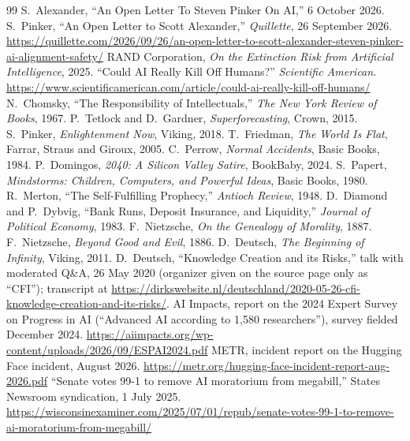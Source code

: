 \documentclass[11pt]{article}
\begin{document}
\begin{thebibliography}{99}
 S.\ Alexander, ``An Open Letter To Steven Pinker On AI,'' 6 October 2026.
 S.\ Pinker, ``An Open Letter to Scott Alexander,'' \emph{Quillette}, 26 September 2026. \url{https://quillette.com/2026/09/26/an-open-letter-to-scott-alexander-steven-pinker-ai-alignment-safety/}
 RAND Corporation, \emph{On the Extinction Risk from Artificial Intelligence}, 2025.
 ``Could AI Really Kill Off Humans?'' \emph{Scientific American}. \url{https://www.scientificamerican.com/article/could-ai-really-kill-off-humans/}
 N.\ Chomsky, ``The Responsibility of Intellectuals,'' \emph{The New York Review of Books}, 1967.
 P.\ Tetlock and D.\ Gardner, \emph{Superforecasting}, Crown, 2015.
 S.\ Pinker, \emph{Enlightenment Now}, Viking, 2018.
 T.\ Friedman, \emph{The World Is Flat}, Farrar, Straus and Giroux, 2005.
 C.\ Perrow, \emph{Normal Accidents}, Basic Books, 1984.
 P.\ Domingos, \emph{2040: A Silicon Valley Satire}, BookBaby, 2024.
 S.\ Papert, \emph{Mindstorms: Children, Computers, and Powerful Ideas}, Basic Books, 1980.
 R.\ Merton, ``The Self-Fulfilling Prophecy,'' \emph{Antioch Review}, 1948.
 D.\ Diamond and P.\ Dybvig, ``Bank Runs, Deposit Insurance, and Liquidity,'' \emph{Journal of Political Economy}, 1983.
 F.\ Nietzsche, \emph{On the Genealogy of Morality}, 1887.
 F.\ Nietzsche, \emph{Beyond Good and Evil}, 1886.
 D.\ Deutsch, \emph{The Beginning of Infinity}, Viking, 2011.
 D.\ Deutsch, ``Knowledge Creation and its Risks,'' talk with moderated Q\&A, 26 May 2020 (organizer given on the source page only as ``CFI''); transcript at \url{https://dirkswebsite.nl/deutschland/2020-05-26-cfi-knowledge-creation-and-its-risks/}.
 AI Impacts, report on the 2024 Expert Survey on Progress in AI (``Advanced AI according to 1,580 researchers''), survey fielded December 2024. \url{https://aiimpacts.org/wp-content/uploads/2026/09/ESPAI2024.pdf}
 METR, incident report on the Hugging Face incident, August 2026. \url{https://metr.org/hugging-face-incident-report-aug-2026.pdf}
 ``Senate votes 99-1 to remove AI moratorium from megabill,'' States Newsroom syndication, 1 July 2025. \url{https://wisconsinexaminer.com/2025/07/01/repub/senate-votes-99-1-to-remove-ai-moratorium-from-megabill/}

\end{thebibliography}
\end{document}
